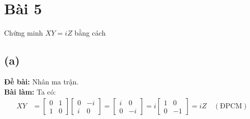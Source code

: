 \section{Bài 5}
Chứng minh $XY=iZ$ bằng cách

\subsection{(a)}
\textbf{Đề bài:} Nhân ma trận.\\
\textbf{Bài làm:}
Ta có:
\begin{align*}
    XY &= \begin{bmatrix}
        0 & 1\\
        1 & 0
    \end{bmatrix}
    \begin{bmatrix}
        0 & -i\\
        i & 0
    \end{bmatrix}
    = \begin{bmatrix}
        i & 0\\
        0 & -i
    \end{bmatrix} = i\begin{bmatrix}
        1 & 0\\
        0 & -1
    \end{bmatrix} = iZ \quad (\text{ĐPCM})
\end{align*}

